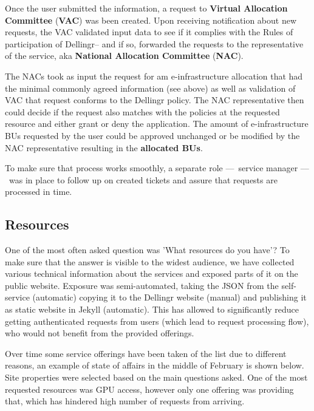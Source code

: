 \documentclass{article}
\newcommand{\dell}{Dellingr\xspace}
\newcommand{\einfra}{e-infrastructure\xspace}
\begin{document}
Once the user submitted the information, a request to \textbf{Virtual Allocation Committee} (\textbf{VAC}) was been created. 
Upon receiving notification about new requests, the VAC validated input data to see if it complies with the Rules of participation of \dell -- and if so, forwarded the requests to the representative of the service, aka \textbf{National Allocation Committee} (\textbf{NAC}).

The NACs took as input the request for am \einfra allocation that had the minimal commonly agreed information (see above) as well as validation of VAC that request conforms to the \dell policy. 
The NAC representative then could decide if the request also matches with
the policies at the requested resource and either grant or deny the application.
The amount of \einfra BUs requested by the user could be approved unchanged or be modified by the NAC representative resulting in the {\bf allocated BUs}.

To make sure that process works smoothly, a separate role –– service manager –– was in place to follow up on created tickets and assure that requests are processed in time.

\subsection{Resources}

One of the most often asked question was 'What resources do you have'? To make sure that the answer is visible to the widest audience, we have collected various technical information about the services and exposed parts of it on the public website. Exposure was semi-automated, taking the JSON from the self-service (automatic) copying it to the \dell website (manual) and publishing it as static website in Jekyll (automatic). This has allowed to significantly reduce getting authenticated requests from users (which lead to request processing flow), who would not benefit from the provided offerings.  

Over time some service offerings have been taken of the list due to different reasons, an example of state of affairs in the middle of February is shown below. Site properties were selected based on the main questions asked. 
One of the most requested resources was GPU access, however only one offering was providing that, which has hindered high number of requests from arriving.
\end{document}
